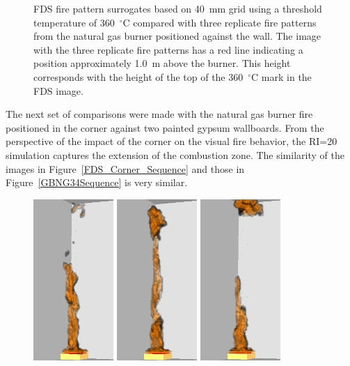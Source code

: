 \documentclass[twoside]{uocthesis}
\begin{document}
{\begin{figure}[h]
  \caption[FDS fire pattern surrogates based on 40~mm grid using a threshold temperature of 350~$^\circ$C compared with three replicate fire patterns from the natural gas burner positioned against the wall]{FDS fire pattern surrogates based on 40~mm grid using a threshold temperature of 360~$^\circ$C compared with three replicate fire patterns from the natural gas burner positioned against the wall.  The image with the three replicate fire patterns has a red line indicating a position approximately 1.0~m above the burner.  This height corresponds with the height of the top of the 360~$^\circ$C mark in the FDS image.}
  \label{FDS_FirePattern_comp}
\end{figure}

The next set of comparisons were made with the natural gas burner fire positioned in the corner against two painted gypsum wallboards. From the perspective of the impact of the corner on the visual fire behavior, the RI=20 simulation captures the extension of the combustion zone.  The similarity of the images in Figure~\ref{FDS_Corner_Sequence} and those in Figure~\ref{GBNG34Sequence} is very similar.     

\begin{figure}[p]
	\includegraphics[width=1.2in]{../Figures/FDSNG_Corner1}
	\includegraphics[width=1.2in]{../Figures/FDSNG_Corner2}
	\includegraphics[width=1.2in]{../Figures/FDSNG_Corner3} \\


\end{figure}}
\end{document}
